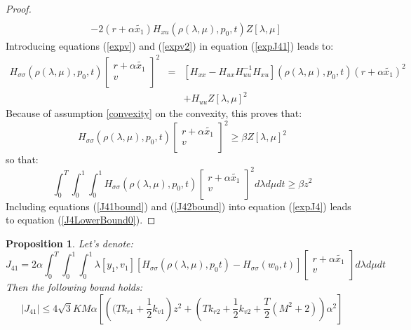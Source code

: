 \documentclass[a4paper,10pt]{article}
\newtheorem{proposition}{Proposition}
\begin{document}
\begin{proof}
\begin{equation}
\begin{split}
        \\
	& - 2(r+\alpha\tilde{x_{1}})H_{xu}(\rho(\lambda,\mu),p_{0},t)Z[\lambda,\mu]
	\end{split}
    \end{equation}
    Introducing equations (\ref{expv}) and (\ref{expv2}) in equation 
    (\ref{expJ41}) leads to:
    \begin{eqnarray*}
        	H_{\sigma \sigma}(\rho(\lambda,\mu),p_{0},t)
	\left[
        \begin{array}
        {c}
            r+\alpha\tilde{x_{1}}  \\
            v  \\
        \end{array}
        \right]^{2} & = & 
	[H_{xx}-H_{ux}H_{uu}^{-1}H_{xu}](\rho(\lambda,\mu),p_{0},t)(r+\alpha\tilde{x_{1}})^{2}
        \\
         &  & +H_{uu}Z[\lambda,\mu]^{2}
    \end{eqnarray*}
    Because of assumption \ref{convexity} on the convexity, this 
    proves that:
    \[
      	H_{\sigma \sigma}(\rho(\lambda,\mu),p_{0},t)
	\left[
        \begin{array}
        {c}
            r+\alpha\tilde{x_{1}}  \\
            v  \\
        \end{array}
        \right]^{2} \geq \beta Z[\lambda,\mu]^{2}
    \]
    so that:
    \begin{equation}
	\int_{0}^{T} \int_{0}^{1} \int_{0}^{1}
        H_{\sigma \sigma}(\rho(\lambda,\mu),p_{0},t)
	\left[
        \begin{array}
        {c}
            r+\alpha\tilde{x_{1}}  \\
            v  \\
        \end{array}
        \right]^{2} d \lambda d \mu dt
	\geq \beta z^{2}
        \label{J41bound}
    \end{equation}
    Including equations (\ref{J41bound}) and (\ref{J42bound}) into 
    equation (\ref{expJ4}) leads to equation (\ref{J4LowerBound0}).
\end{proof}
\begin{proposition}\label{J41boundProp}
    Let's denote:
    \[
        J_{41} = 2\alpha \int_{0}^{T} \int_{0}^{1} \int_{0}^{1} \lambda \left[y_{1},v_{1}\right]
	[H_{\sigma \sigma}(\rho(\lambda,\mu),p_{0}t)-H_{\sigma \sigma}(w_{0},t)]
        \left[
        \begin{array}
        {c}
            r+\alpha\tilde{x_{1}}  \\
            v  \\
        \end{array}
        \right] d \lambda d \mu dt
    \]
    Then the following bound holds:
    \begin{equation}
        |J_{41}| \leq 4 
            \sqrt{3}KM\alpha\left[\left((Tk_{r1}+\frac{1}{2}k_{v1}\right)z^{2}
            +\left(Tk_{r2}+\frac{1}{2}k_{v2}+\frac{T}{2}(M^{2}+2)\right)\alpha^{2}\right] 
        \label{J41bound2}
    \end{equation}
\end{proposition}
\end{document}
